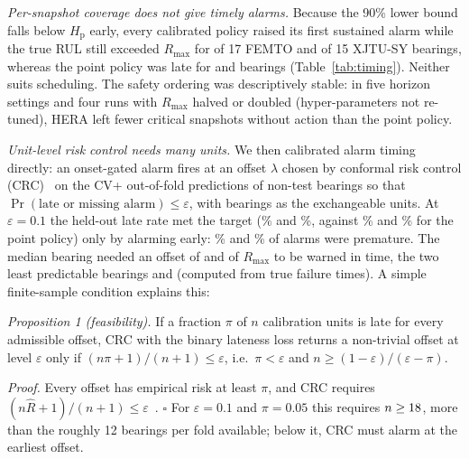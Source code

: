 \documentclass[conference]{IEEEtran}
\newcommand{\Hp}{H_{\mathrm{p}}}
\begin{document}


\textit{Per-snapshot coverage does not give timely alarms.} Because the 90\% lower bound falls below $\Hp$ early, every calibrated policy raised its first sustained alarm while the true RUL still exceeded $R_{\max}$ for \fePremHera{} of 17 FEMTO and \xjPremHera{} of 15 XJTU-SY bearings, whereas the point policy was late for \feLatePoint{} and \xjLatePoint{} bearings (Table~\ref{tab:timing}). Neither suits scheduling. The safety ordering was descriptively stable: in five horizon settings and four runs with $R_{\max}$ halved or doubled (hyper-parameters not re-tuned), HERA left fewer critical snapshots without action than the point policy.

\textit{Unit-level risk control needs many units.} We then calibrated alarm timing directly: an onset-gated alarm fires at an offset $\lambda$ chosen by conformal risk control (CRC)~\cite{angelopoulos2024crc} on the CV+ out-of-fold predictions of non-test bearings so that $\Pr(\text{late or missing alarm})\le\varepsilon$, with bearings as the exchangeable units. At $\varepsilon{=}0.1$ the held-out late rate met the target (\feLateCrcTen\% and \xjLateCrcTen\%, against \feLatePointHp\% and \xjLatePointHp\% for the point policy) only by alarming early: \fePremCrcTen\% and \xjPremCrcTen\% of alarms were premature. The median bearing needed an offset of \feReqOffMed{} and \xjReqOffMed{} of $R_{\max}$ to be warned in time, the two least predictable bearings \feReqOffTop{} and \xjReqOffTop{} (computed from true failure times). A simple finite-sample condition explains this:

\textit{Proposition 1 (feasibility).} If a fraction $\pi$ of $n$ calibration units is late for every admissible offset, CRC with the binary lateness loss returns a non-trivial offset at level $\varepsilon$ only if $(n\pi+1)/(n+1)\le\varepsilon$, i.e.\ $\pi<\varepsilon$ and $n\ge(1-\varepsilon)/(\varepsilon-\pi)$.

\textit{Proof.} Every offset has empirical risk at least $\pi$, and CRC requires $(n\hat R+1)/(n+1)\le\varepsilon$~\cite{angelopoulos2024crc}. $\square$ For $\varepsilon{=}0.1$ and $\pi{=}0.05$ this requires $n\ge18$, more than the roughly 12 bearings per fold available; below it, CRC must alarm at the earliest offset.


\end{document}
